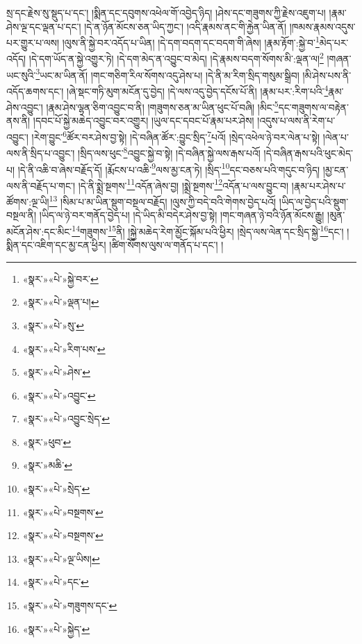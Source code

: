 སྲ་དང་རྗེས་སུ་སྡུད་པ་དང་། །སྨིན་དང་དབུགས་འཕེལ་གོ་འབྱེད་ཉིད། །ཤེས་དང་གཟུགས་ཀྱི་རྗེས་འཇུག་པ། །རྣམ་ཤེས་ལྔ་དང་ལྡན་པ་དང་། །དེ་ན་ཉོན་མོངས་ཅན་ཡིད་ཀྱང་། །འདི་རྣམས་ནང་གི་རྐྱེན་ཡིན་ནོ། །ཁམས་རྣམས་འདུས་པར་གྱུར་པ་ལས། །ལུས་ནི་སྐྱེ་བར་འདོད་པ་ཡིན། །དེ་དག་བདག་དང་བདག་གི་ཞེས། །རྣམ་རྟོག་:སྐྱེ་བ་\footnote{«སྣར་»«པེ་»སྐྱེ་བར་}མེད་པར་འདོད། །དེ་དག་ཡོད་ན་སྐྱེ་འགྱུར་ཏེ། །དེ་དག་མེད་ན་འབྱུང་བ་མེད། །དེ་རྣམས་བདག་སོགས་མི་:ལྡན་ལ།\footnote{«སྣར་»«པེ་»ལྡན་པ།} །གཞན་ཡང་སུའི་\footnote{«སྣར་»«པེ་»སུ་}ཡང་མ་ཡིན་ནོ། །གང་གཅིག་རིལ་སོགས་འདུ་ཤེས་པ། །དེ་ནི་མ་རིག་སྲིད་གསུམ་སྒྲིབ། །མི་ཤེས་པས་ནི་འདོད་ཆགས་དང་། །ཞེ་སྡང་གཏི་མུག་མངོན་དུ་བྱེད། །དེ་ལས་འདུ་བྱེད་དངོས་པོ་ནི། །རྣམ་པར་:རིག་པའི་\footnote{«སྣར་»«པེ་»རིག་པས་}རྣམ་ཤེས་འབྱུང་། །རྣམ་ཤེས་ལྷན་ཅིག་འབྱུང་བ་ནི། །གཟུགས་ཅན་མ་ཡིན་ཕུང་པོ་བཞི། །མིང་\footnote{«སྣར་»«པེ་»ཤེས་}དང་གཟུགས་ལ་བརྟེན་ནས་ནི། །དབང་པོ་སྐྱེ་མཆེད་འབྱུང་བར་འགྱུར། །ཡུལ་དང་དབང་པོ་རྣམ་པར་ཤེས། །འདུས་པ་ལས་ནི་རེག་པ་འབྱུང་། །རེག་བྱུང་\footnote{«སྣར་»«པེ་»འབྱུང་}ཚོར་བར་ཤེས་བྱ་སྟེ། །དེ་བཞིན་ཚོར་:བྱུང་སྲིད་\footnote{«སྣར་»«པེ་»འབྱུང་སྲེད་}པའོ། །སྲེད་འཕེལ་ཉེ་བར་ལེན་པ་སྟེ། །ལེན་པ་ལས་ནི་སྲིད་པ་འབྱུང་། །སྲིད་ལས་ཕུང་\footnote{«སྣར་»ཕུབ་}འབྱུང་སྐྱེ་བ་སྟེ། །དེ་བཞིན་སྐྱེ་ལས་རྒས་པའོ། །དེ་བཞིན་རྒས་པའི་ཕུང་མེད་པ། །དེ་ནི་འཆི་བ་ཞེས་བརྗོད་དོ། །རྨོངས་པ་འཆི་\footnote{«སྣར་»མཆི་}ལས་མྱ་ངན་ཏེ། །སྲིད་\footnote{«སྣར་»«པེ་»སྲེད་}དང་བཅས་པའི་གདུང་བ་ཉིད། །མྱ་ངན་ལས་ནི་བརྗོད་པ་གང་། །དེ་ནི་སྨྲེ་སྔགས་\footnote{«སྣར་»«པེ་»བསྔགས་}འདོན་ཞེས་བྱ། །སྨྲེ་སྔགས་\footnote{«སྣར་»«པེ་»བསྔགས་}འདོན་པ་ལས་བྱུང་བ། །རྣམ་པར་ཤེས་པ་ཚོགས་:ལྔ་ཡི།\footnote{«སྣར་»«པེ་»ལྔ་ཡིས།} །སིམ་པ་མ་ཡིན་སྡུག་བསྔལ་བརྗོད། །ལུས་ཀྱི་བདེ་བའི་གེགས་བྱེད་པའོ། །ཡིད་ལ་བྱེད་པའི་སྡུག་བསྔལ་ནི། །ཡིད་ལ་ཉེ་བར་གནོད་བྱེད་པ། །དེ་ཡིད་མི་བདེར་ཤེས་བྱ་སྟེ། །གང་གཞན་ཉེ་བའི་ཉོན་མོངས་རྒྱུ། །མུན་མངོན་ཤེས་:དང་མིང་\footnote{«སྣར་»«པེ་»དང་}གཟུགས་\footnote{«སྣར་»«པེ་»གཟུགས་དང་}ནི། །སྐྱེ་མཆེད་རེག་མྱོང་སྐོམ་པའི་ཕྱིར། །སྲེད་ལས་ལེན་དང་སྲིད་སྐྱེ་\footnote{«སྣར་»«པེ་»སྐྱེད་}དང་། །སྨིན་དང་འཇིག་དང་མྱ་ངན་ཕྱིར། །ཚིག་སོགས་ལུས་ལ་གནོད་པ་དང་། །
